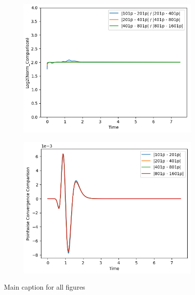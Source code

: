 \begin{figure}[t!]
    \centering
    \begin{subfigure}[b]{0.45\textwidth}
        \centering
        \includegraphics[width=\textwidth]{Images/Wave_Equation_1+1-Norm.png}
    \end{subfigure}
    \hfill
    \begin{subfigure}[b]{0.45\textwidth}
        \centering
        \includegraphics[width=\textwidth]{Images/Wave_Equation_1+1-Pointwise.png}
    \end{subfigure}
    \caption{Main caption for all figures}
    \label{fig:compact_wave_equation-2nd_order-convergence}
\end{figure}


